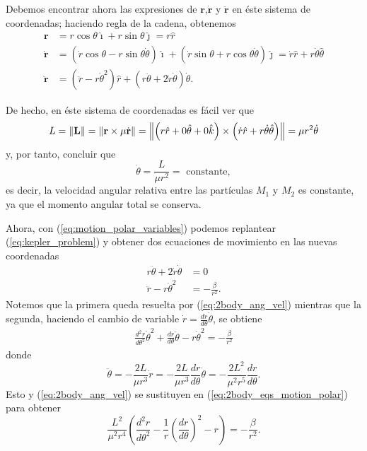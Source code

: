 Debemos encontrar ahora las expresiones de $\mathbf{r}$,$\dot{\mathbf{r}}$ y $\ddot{\mathbf{r}}$ en éste sistema de coordenadas; haciendo regla de la cadena, obtenemos
\begin{align}
 \mathbf{r} &= r \cos \theta \hat{\imath} + r \sin \theta \hat{\jmath} = r \hat{r} \\
 \dot{\mathbf{r}} &= \left( \dot{r} \cos \theta - r \sin \theta \dot{\theta} \right) \hat{\imath} + \left( \dot{r} \sin \theta + r \cos \theta \dot{\theta} \right) \hat{\jmath} = \dot{r}\hat{r} + r \dot{\theta} \hat{\theta} \\
 \ddot{\mathbf{r}} &= \left(\ddot{r} - r \dot{\theta}^2 \right) \hat{r} + \left( r \ddot{\theta} + 2 \dot{r}\dot{\theta} \right) \dot{\theta}.
 \label{eq:motion_polar_variables}
\end{align}

De hecho, en éste sistema de coordenadas es fácil ver que
\begin{equation}
 L = \left\lVert \mathbf{L} \right\rVert = \left\lVert \mathbf{r} \times \mu \dot{\mathbf{r}} \right\rVert = \left\lVert \left( r \hat{r} + 0 \hat{\theta} + 0 \hat{k} \right) \times \left( \dot{r} \hat{r} + r \dot{\theta} \hat{\theta} \right) \right\rVert = \mu r^2 \dot{\theta}
\end{equation}
y, por tanto, concluir que
\begin{equation}
\dot{\theta} = \frac{L}{\mu r^2} = \text{ constante},
\label{eq:2body_ang_vel}
\end{equation}
es decir, la velocidad angular relativa entre las partículas $M_1$ y $M_2$ es constante, ya que el momento angular total se conserva.

Ahora, con (\ref{eq:motion_polar_variables}) podemos replantear (\ref{eq:kepler_problem})  y obtener dos ecuaciones de movimiento en las nuevas coordenadas
\begin{align}
 r \ddot{\theta} + 2 \dot{r} \dot{\theta} &= 0 \\
 \ddot{r} - r \dot{\theta}^2 &= -\frac{\beta}{r^2}.
 \label{eq:2body_eqs_motion_polar}
\end{align}
Notemos que la primera queda resuelta por (\ref{eq:2body_ang_vel}) mientras que la segunda, haciendo el cambio de variable $\dot{r} = \frac{d r}{d\theta} \dot{\theta}$, se obtiene
\begin{align}
 \frac{d^2 r}{d \theta^2} \dot{\theta}^2 + \frac{dr}{d\theta} \ddot{\theta} - r \dot{\theta}^2 = - \frac{\beta}{r^2}
\end{align}
donde 
\begin{equation*}
 \ddot{\theta} = -\frac{2L}{\mu r^3}\dot{r} = -\frac{2L}{\mu r^3} \frac{dr}{d\theta}\dot{\theta} = - \frac{2L^2}{\mu^2 r^5} \frac{dr}{d\theta}.
\end{equation*}
Esto y (\ref{eq:2body_ang_vel}) se sustituyen en  (\ref{eq:2body_eqs_motion_polar}) para obtener
\begin{equation*}
 \frac{L^2}{\mu^2 r^4}\left( \frac{d^2r}{d\theta^2} - \frac{1}{r} \left(\frac{dr}{d\theta} \right)^2 -r \right) = - \frac{\beta}{r^2}.
\end{equation*}

